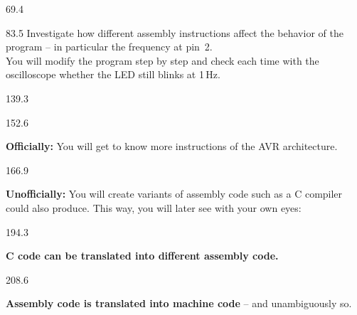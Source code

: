 \documentclass{aslab}
\begin{document}
\nextpage
\begin{region}{69.4}
\end{region}

\begin{region}[pitch=13.17]{83.5}
Investigate how different assembly instructions affect the behavior of the
program -- in particular the frequency at pin~2.\\
You will modify the program step by step and check each time with the
oscilloscope whether the LED still blinks at 1\,Hz.
\end{region}

\begin{region}{139.3}
\end{region}

\begin{region}{152.6}
\begin{dashlist}
\item \textbf{Officially:} You will get to know more instructions of the AVR
  architecture.
\end{dashlist}
\end{region}

\begin{region}[pitch=14.3]{166.9}
\begin{dashlist}
\item \textbf{Unofficially:} You will create variants of assembly code such
  as a C compiler could also produce. This way, you will later see with
  your own eyes:
\end{dashlist}
\end{region}

\begin{region}[x=68.7,right=0]{194.3}
\begin{dashlist}
\item \textbf{C code can be translated into different assembly code.}
\end{dashlist}
\end{region}

\begin{region}[x=68.7,right=0]{208.6}
\begin{dashlist}
\item \textbf{Assembly code is translated into machine code} -- and
  unambiguously so.
\end{dashlist}
\end{region}
\end{document}
